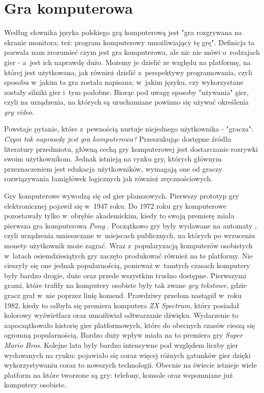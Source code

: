 \documentclass[12pt,a4paper,oneside]{book}
\theoremstyle{definition}
\numberwithin{equation}{chapter}
\begin{document}
\section{Gra komputerowa}
Według słownika języka polskiego grą komputerową \cite{GraKomputerowa} jest "gra rozgrywana na ekranie monitora; też: program komputerowy umożliwiający tę grę". Definicja ta pozwala nam zrozumieć czym jest gra komputerowa, ale nic nie mówi o~rodzajach gier - a~jest ich naprawdę dużo. Możemy je dzielić ze względu na platformę, na której jest użytkowana, jak również dzielić z~perspektywy programowania, czyli sposobu w~jakim ta gra została napisana; w~jakim języku, czy wykorzystane zostały silniki gier i~tym podobne. Biorąc pod uwagę sposoby "używania" gier, czyli  na urządzenia, na których są uruchamiane powinno się używać określenia \textit{gry video}.
\par Powstaje  pytanie, które z~pewnością nurtuje niejednego użytkownika -  "gracza": \textit{Czym tak naprawdę jest gra komputerowa?} Przeszukując dostępne źródła literatury przedmiotu, główną cechą gry komputerowej jest dostarczanie rozrywki swoim użytkownikom. Jednak istnieją na rynku gry, których głównym przeznaczeniem jest edukacja użytkowników, wymagają one od graczy rozwiązywania łamigłówek logicznych jak również zręcznościowych.
\par Gry komputerowe wywodzą się od gier planszowych. Pierwszy prototyp gry elektronicznej pojawił się w~1947 roku. Do 1972 roku gry komputerowe pozostawały tylko w~obrębie akademickim, kiedy to swoją premierę miała pierwsza gra komputerowa \textit{Pong} \cite{Pong}. Początkowo gry były wydawane na automaty \cite{Automat}, czyli urządzenia umieszczane w~miejscach publicznych, na których po wrzuceniu monety użytkownik może zagrać. Wraz z~popularyzacją komputerów osobistych w~latach osiemdziesiątych gry zaczęto produkować również na te platformy. Nie cieszyły się one jednak popularnością, ponieważ w~tamtych czasach komputery były bardzo drogie, duże oraz przede wszystkim trudno dostępne. Pierwszymi grami, które trafiły na komputery osobiste były tak zwane \textit{gry tekstowe}, gdzie gracz grał w~nie poprzez linię komend. Prawdziwy przełom nastąpił w~roku 1982, kiedy to odbyła się premiera komputera \textit{ZX Spectrum}, który posiadał kolorowy wyświetlacz oraz umożliwiał odtwarzanie dźwięku. Wydarzenie to zapoczątkowało historię gier platformowych, które do obecnych czasów cieszą się ogromną popularnością. Bardzo duży wpływ miała na to premiera gry \textit{Super Mario Bros}. Kolejne lata były bardzo intensywne pod względem liczby gier wydawanych na rynku: pojawiało się coraz więcej różnych gatunków gier dzięki wykorzystywaniu coraz to nowszych technologii. Obecnie na świecie istnieje wiele platform na które tworzone są gry: telefony, konsole oraz wspomniane już komputery osobiste. 
\end{document}
